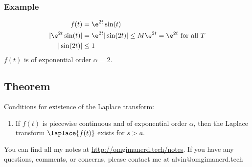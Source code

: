 \documentclass{math}
\begin{document}
\subsubsection*{Example}
\begin{align*}
  f(t) &= \e^{2t}\sin(t) \\
  |\e^{2t}\sin(t)| &= \e^{2t}|\sin(2t)| \le
    M\e^{2t} = \e^{2t} \text{ for all } T \\
  |\sin(2t)| &\le 1
\end{align*}
\( f(t) \) is of exponential order \( \alpha = 2 \).

\subsection*{Theorem}
Conditions for existence of the Laplace transform:
\begin{enumerate}
  \item If \( f(t) \) is piecewise continuous and of exponential order
  \( \alpha \), then the Laplace transform \( \laplace{f(t)} \) exists for
  \( s>a \).
\end{enumerate}

\begin{center}
  You can find all my notes at \url{http://omgimanerd.tech/notes}. If you have
  any questions, comments, or concerns, please contact me at
  alvin@omgimanerd.tech
\end{center}
\end{document}
